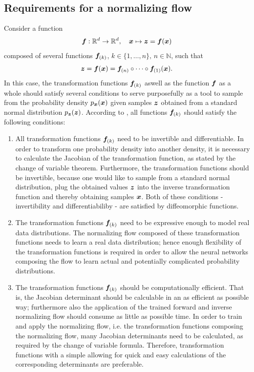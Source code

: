 \documentclass[a4paper,12pt]{report}
\def\lk#1{{\color{black}{#1}}}
\begin{document}
\subsection{Requirements for a normalizing flow}
Consider a function 
\begin{equation}
\bm{f}:\mathbb{R}^d \rightarrow \mathbb{R}^d, \quad \bm{x} \mapsto \bm{z} = \bm{f}(\bm{x})
\end{equation} composed of several functions $\bm{f}_{(k)}$, $k \in \{1,\dots,n\},\,n \in \mathbb{N}$, such that \begin{equation}
\bm{z} = \bm{f}(\bm{x}) = \bm{f}_{(n)} \circ \dots \circ \bm{f}_{(1)}(\bm{x}).
\end{equation} In this case, the transformation functions $\bm{f}_{(k)}$ aswell as the function $\bm{f}$ as a whole should satisfy several conditions to serve purposefully as a tool to sample from \lk{an approximation of} the probability density $p_{\bm{x}}(\bm{x})$ given samples $\bm{z}$ obtained from a standard normal distribution $p_{\bm{z}}(\bm{z})$. According to \cite{Kobyzev.2021}, all functions $\bm{f}_{(k)}$ should satisfy the following conditions:
\begin{enumerate}
\item All transformation functions $\bm{f}_{(k)}$ need to be invertible and differentiable. In order to transform one probability density into another density, it is necessary to calculate the Jacobian of the transformation function, as stated by the change of variable theorem. Furthermore, the transformation functions should be invertible, because one would like to sample from a standard normal distribution, plug the obtained values $\bm{z}$ into the inverse transformation function and thereby obtaining samples $\bm{x}$. Both of these conditions - invertibility and differentiabiliby - are satisfied by diffeomorphic functions.
\item The transformation functions $\bm{f}_{(k)}$ need to be expressive enough to model real data distributions. The normalizing flow composed of these transformation functions needs to learn a real data distribution; hence enough flexibility of the transformation functions is required in order to allow the neural networks composing the flow to learn actual and potentially complicated probability distributions.
\item The transformation functions $\bm{f}_{(k)}$ should be computationally efficient. That is, the Jacobian determinant should be calculable in an as efficient as possible way; furthermore also the application of the trained forward and inverse normalizing flow should consume as little as possible time. In order to train and apply the normalizing flow, i.e. the transformation functions composing the normalizing flow, many Jacobian determinants need to be calculated, as required by the change of variable formula. Therefore, transformation functions with a simple \lk{Jacobian} allowing for quick and easy calculations of the corresponding determinants are preferable.
\end{enumerate}
\end{document}
